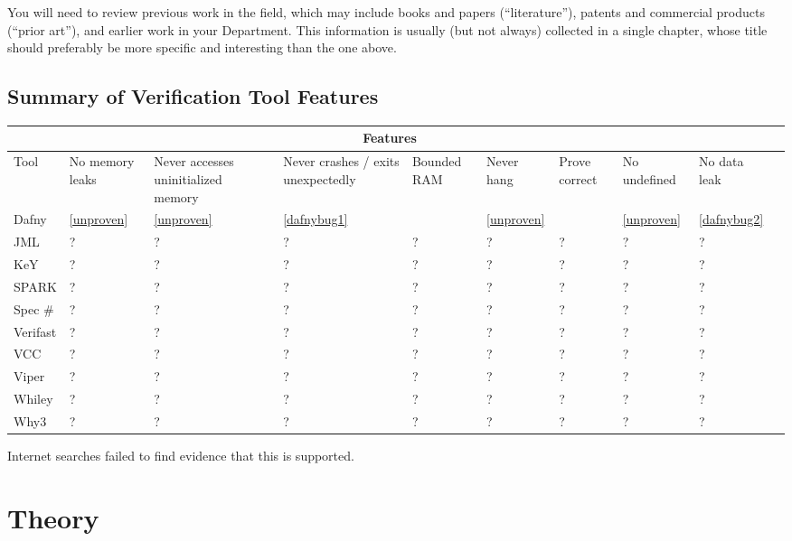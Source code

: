 \documentclass[12pt,openany,a4paper]{book}
\begin{document}
You will need to review previous work in the field, which may include
books and papers (``literature''), patents and commercial products
(``prior art''), and earlier work in your Department.  This
information is usually (but not always) collected in a single chapter,
whose title should preferably be more specific and interesting than
the one above.

\section{Summary of Verification Tool Features}

\begin{tabular}{ |p{1.3cm}||p{1.5cm}|p{1.5cm}|p{1.5cm}| p{1.5cm}|p{1.5cm}|p{1.5cm}|p{1cm}|p{1cm}| p{1cm}| }
 \hline
 \multicolumn{9}{|c|}{Features} \\
 \hline
Tool & 
No memory leaks & 
Never accesses uninitialized memory & 
Never crashes / exits unexpectedly &
Bounded
RAM &
Never hang &
Prove correct &
No undefined &
No data leak 
\\
 \hline
Dafny 		& \cellcolor{red} \ref{unproven} & \cellcolor{red} \ref{unproven} & \cellcolor{red} \ref{dafnybug1} & \cellcolor{red} & \cellcolor{red} \ref{unproven} & \cellcolor{green} & \cellcolor{red} \ref{unproven}  & \cellcolor{red} \ref{dafnybug2} \\
 \hline
JML   		& ? & ? & ?& ?& ?& ?& ?& ?\\
 \hline
KeY 		& ? & ? & ?& ?& ?& ?& ?& ?\\
 \hline
SPARK		& ? & ? & ?& ?& ?& ?& ?& ?\\
 \hline
Spec \#		& ? & ? & ?& ?& ?& ?& ?& ?\\
 \hline
Verifast& ? & ? & ?& ?& ?& ?& ?& ?\\
 \hline
VCC& ? & ? & ?& ?& ?& ?& ?& ?\\
 \hline
Viper& ? & ? & ?& ?& ?& ?& ?& ?\\
 \hline
Whiley& ? & ? & ?& ?& ?& ?& ?& ?\\
 \hline
Why3& ? & ? & ?& ?& ?& ?& ?& ?\\
 \hline
\end{tabular}

\label{unproven} Internet searches failed to find evidence that this is supported.

\chapter{Theory}
\end{document}
